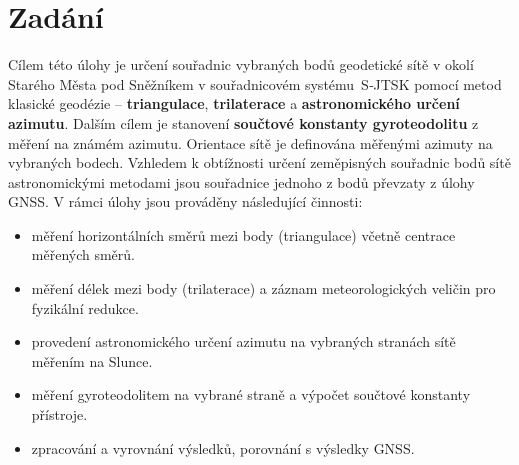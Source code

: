 \section{Zadání}

Cílem této úlohy je určení souřadnic vybraných bodů geodetické sítě v okolí Starého Města pod Sněžníkem v souřadnicovém systému~S‑JTSK pomocí metod klasické geodézie – \textbf{triangulace}, \textbf{trilaterace} a \textbf{astronomického určení azimutu}. Dalším cílem je stanovení \textbf{součtové konstanty gyroteodolitu} z měření na známém azimutu. Orientace sítě je definována měřenými azimuty na vybraných bodech. Vzhledem k obtížnosti určení zeměpisných souřadnic bodů sítě astronomickými metodami jsou souřadnice jednoho z bodů převzaty z úlohy GNSS. V rámci úlohy jsou prováděny následující činnosti:
\begin{itemize}
    \item měření horizontálních směrů mezi body (triangulace) včetně centrace měřených směrů.
    \item měření délek mezi body (trilaterace) a záznam meteorologických veličin pro fyzikální redukce.
    \item provedení astronomického určení azimutu na vybraných stranách sítě měřením na Slunce.
    \item měření gyroteodolitem na vybrané straně a výpočet součtové konstanty přístroje.
    \item zpracování a vyrovnání výsledků, porovnání s výsledky GNSS.
\end{itemize}
